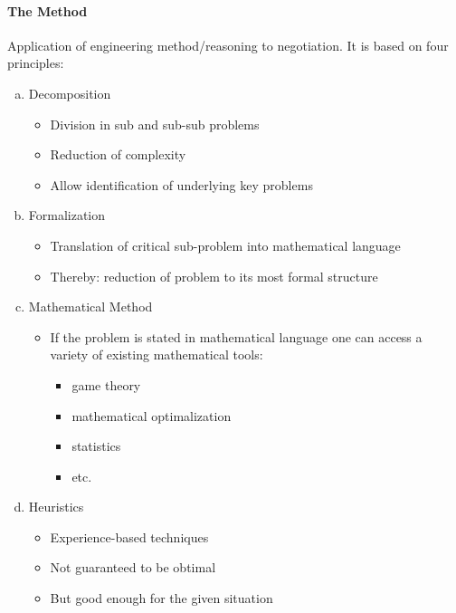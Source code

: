\paragraph{The Method}

Application of engineering method/reasoning to negotiation. It is based
on four principles:
\begin{enumerate}[a.]
    \item Decomposition
        \begin{itemize}
            \item Division in sub and sub-sub problems
            \item Reduction of complexity
            \item Allow identification of underlying key problems
        \end{itemize}
    \item Formalization
        \begin{itemize}
            \item Translation of critical sub-problem into mathematical language
            \item Thereby: reduction of problem to its most formal structure
        \end{itemize}
    \item Mathematical Method
        \begin{itemize}
            \item If the problem is stated in mathematical language one can
                access a variety of existing mathematical tools:
                \begin{itemize}
                    \item game theory
                    \item mathematical optimalization
                    \item statistics
                    \item etc.
                \end{itemize}
        \end{itemize}
    \item Heuristics
        \begin{itemize}
            \item Experience-based techniques
            \item Not guaranteed to be obtimal
            \item But good enough for the given situation
        \end{itemize}
\end{enumerate}

